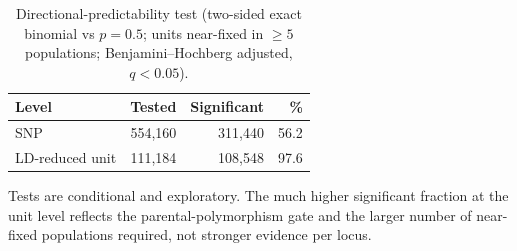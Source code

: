 \begin{table}[htbp]
\centering
\small
\caption{Directional-predictability test (two-sided exact binomial vs $p=0.5$; units near-fixed in $\geq5$ populations; Benjamini--Hochberg adjusted, $q<0.05$).}
\label{tab:predtest}
\begin{tabular}{l r r r}
\toprule
Level & Tested & Significant & \% \\
\midrule
SNP & 554,160 & 311,440 & 56.2 \\
LD-reduced unit & 111,184 & 108,548 & 97.6 \\
\bottomrule
\end{tabular}
\par\smallskip\footnotesize\raggedright Tests are conditional and exploratory. The much higher significant fraction at the unit level reflects the parental-polymorphism gate and the larger number of near-fixed populations required, not stronger evidence per locus.
\end{table}
